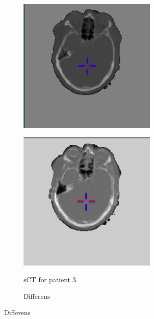 \begin{figure}
\begin{subfigure}[b]{0.3\textwidth}
        \includegraphics[width=0.75\textwidth]{colager/loocv_ct/loocv_010850_ct.png}
        \label{col:loocv_ct_pat3_ct}
    \end{subfigure}\hfill
    \begin{subfigure}[b]{0.3\textwidth}
        \caption{sCT for patient 3.}
        \includegraphics[width=0.75\textwidth]{colager/loocv_ct/loocv_010850_sct.png}
        \label{col:loocv_ct_pat3_sct}
    \end{subfigure}\hfill
    \begin{subfigure}[b]{0.3\textwidth}
        \caption{Differens}

\end{subfigure}
\end{figure}
